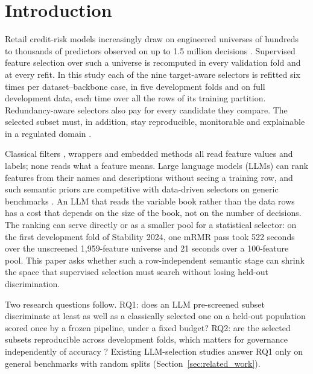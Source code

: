 \documentclass[final,5p,twocolumn]{elsarticle}
\begin{document}

\section{Introduction}
\label{sec:introduction}

Retail credit-risk models increasingly draw on engineered universes of hundreds to thousands of predictors observed on up to 1.5 million decisions \cite{thomas2002,siddiqi2006}. Supervised feature selection over such a universe is recomputed in every validation fold and at every refit. In this study each of the nine target-aware selectors is refitted six times per dataset--backbone case, in five development folds and on full development data, each time over all the rows of its training partition. Redundancy-aware selectors also pay for every candidate they compare. The selected subset must, in addition, stay reproducible, monitorable and explainable in a regulated domain \cite{lessmann2015,gunnarsson2021,ballegeer2025}.

Classical filters \cite{guyon2003,peng2005}, wrappers \cite{kohavi1997,guyon2002,kursa2010} and embedded methods \cite{tibshirani1996,lundberg2017} all read feature values and labels; none reads what a feature means. Large language models (LLMs) can rank features from their names and descriptions without seeing a training row, and such semantic priors are competitive with data-driven selectors on generic benchmarks \cite{choi2022,jeong2025,li2025sigkdd,zhang2025llmlasso}. An LLM that reads the variable book rather than the data rows has a cost that depends on the size of the book, not on the number of decisions. The ranking can serve directly or as a smaller pool for a statistical selector: on the first development fold of Stability 2024, one mRMR pass took 522 seconds over the unscreened 1,959-feature universe and 21 seconds over a 100-feature pool. This paper asks whether such a row-independent semantic stage can shrink the space that supervised selection must search without losing held-out discrimination.

Two research questions follow. RQ1: does an LLM pre-screened subset discriminate at least as well as a classically selected one on a held-out population scored once by a frozen pipeline, under a fixed budget? RQ2: are the selected subsets reproducible across development folds, which matters for governance independently of accuracy \cite{kalousis2007,nogueira2018}? Existing LLM-selection studies answer RQ1 only on general benchmarks with random splits (Section~\ref{sec:related_work}).
\end{document}
